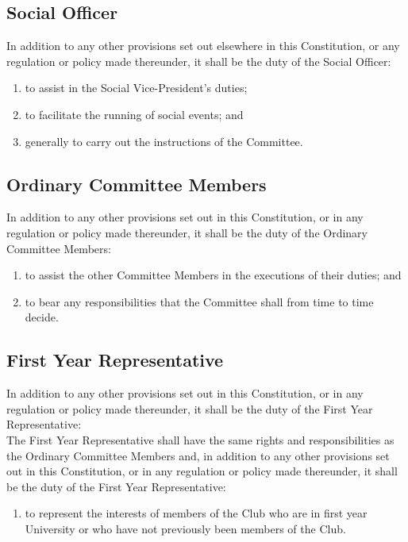 \documentclass[11pt]{article} %
\begin{document}
{\color{ForestGreen} \subsection{Social Officer}
In addition to any other provisions set out elsewhere in this Constitution, or any regulation or policy made thereunder, it shall be the duty of the Social Officer:
\begin{enumerate}
	\item to assist in the Social Vice-President's duties;
	\item to facilitate the running of social events; and
	\item generally to carry out the instructions of the Committee.
\end{enumerate}}

\subsection{Ordinary Committee Members}
In addition to any other provisions set out in this Constitution, or in any regulation or policy made thereunder, it shall be the duty of the Ordinary Committee Members:
\begin{enumerate}
	\item to assist the other Committee Members in the executions of their duties; and
	\item to bear any responsibilities that the Committee shall from time to time decide.
\end{enumerate}

\subsection{First Year Representative}
{\color{red}In addition to any other provisions set out in this Constitution, or in any regulation or policy made thereunder, it shall be the duty of the First Year Representative:}\\
{\color{ForestGreen}The First Year Representative shall have the same rights and responsibilities as the Ordinary Committee Members and, in addition to any other provisions set out in this Constitution, or in any regulation or policy made thereunder, it shall be the duty of the First Year Representative:}
\begin{enumerate}
	\item to represent the interests of members of the Club who are in first year University or who have not previously been members of the Club.
\end{enumerate}
\end{document}
